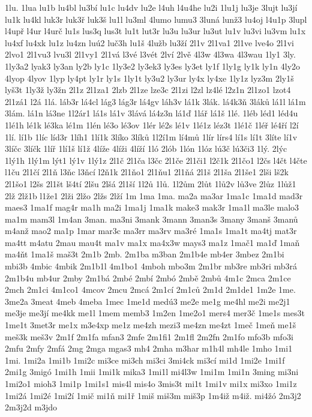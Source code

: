 1lu.
1lua
lu1b
lu4bl
lu3bí
lu1c
lu4dv
lu2e
l4uh
l4u4he
lu2i
1lu1j
lu3je
3lujt
lu3jí
lu1k
lu4kl
luk3r
luk3ř
luk3š
lu1l
lu3ml
4lumo
lumu3
3luná
lunž3
lu4oj
l4u1p
3lupl
l4upř
l4ur
l4urč
lu1s
lus3q
lus3t
lu1t
lut3r
lu3u
lu3ur
lu3ut
lu1v
lu3vi
lu3vm
lu1x
lu4xf
lu4xk
lu1z
lu4zn
luú2
luč3h
lu1š
4lužb
lu3ží
2l1v
2l1va1
2l1ve
lve4o
2l1vi
2lvo1
2l1vu3
lvu3l
2l1vy1
2l1vá
l3vé
l3vét
2lví
2lvě
4l3w
4l3wa
4l3wau
1ly1
3ly.
1ly3a2
lyak3
ly3an
ly2b
ly1c
1ly3e2
ly3ek3
ly3es
ly3et
ly1f
1ly1g
ly1k
ly1n
4ly2o
4lyop
4lyov
1lyp
ly4pt
ly1r
ly1s
1ly1t
ly3u2
ly3ur
ly4x
ly4xe
1ly1z
lyz3m
2ly1š
lyš3t
1ly3ž
ly3žn
2l1z
2l1za1
2lzb
2l1ze
lze3c
2l1zi
l2zl
lz4lé
l2z1n
2l1zo1
lzot4
2l1zá1
l2á
1lá.
láb3r
lá4cl
lág3
lág3r
lá4gv
láh3v
lá1k
3lák.
lá4k3ň
3láků
lá1l
lá1m
3lám.
lá1n
lá3ne
1l2ár1
lá1s
lá1v
3lává
lá4z3n
lá1ď
1lář
lá1š
1lé.
1léb
léd1
léd4u
1lé1h
lé1k
lé3ka
lé1m
1lén
lé3o
lé3ov
1lér
lé2s
lé1v
1lé1z
léz3t
1lé1č
1léř
lé4ří
l2í
1lí.
lí1b
1líc
líd3r
1líh1
1lí1k
3líko
3líků
1l2í1m
lí4mů
1lír
lírs4
lí1s
lí1t
3líte
lí1v
3líčc
3líčk
1líř
1lí1š
lí1ž
4líže
4líži
4líží
1ló
2lób
1lón
1lóz
lú3č
lú3či3
1lý.
2lýc
1lý1h
1lý1m
lýt1
lý1v
1lý1z
2l1č
2l1ča
l3čc
2l1če
2l1či1
l2č1k
2l1čo1
l2čs
l4čt
l4čte
l1ču
2l1čí
2l1ň
l3ňc
l3ňcí
l2ň1k
2l1ňo1
2l1ňu1
2l1ňá
2l1š
2l1ša
2l1še1
2lši
lš2k
2l1šo1
l2šs
2l1št
lš4tí
2lšu
2lšá
2l1ší
1l2ů
1lů.
1l2ům
2lůt
1lů2v
lů3ve
2lůz
1lůž1
2lž
2lž1b
l1že1
2lži
2lžo
2lžs
2lží
1m
1ma
1ma.
ma2a
ma3ar
1ma1c
1ma1d
mad3r
maes3
1ma1f
mag4r
ma1h
ma2i
1ma1j
1ma1k
make3
mak3r
1ma1l
ma3le
malo3
ma1m
mam3l
1m4an
3man.
ma3ni
3mank
3mann
3man3s
3many
3manš
3manů
m4anž
mao2
ma1p
1mar
mar3c
ma3rr
ma3rv
ma3ré
1ma1s
1ma1t
ma4tj
mat3r
ma4tt
m4atu
2mau
mau4t
ma1v
ma1x
ma4x3w
mays3
ma1z
1mač1
ma1ď
1maň
ma4ňt
1ma1š
maš3t
2m1b
2mb.
2m1ba
m3ban
2m1b4e
mb4er
3mbez
2m1bi
mbi3b
4mbic
4mbik
2m1b1l
4m1bo1
4mboh
mbo3m
2m1br
mb3re
mb3ri
mb3rá
2m1b4u
mb4ur
2mby
2m1bá
2mbé
2mbí
2mbó
2mbě
2mbů
4m1c
2mca
2m1ce
2mch
2m1ci
4m1co1
4mcov
2mcu
2mcá
2m1cí
2m1ců
2m1d
2m1de1
1m2e
1me.
3me2a
3meat
4meb
4meba
1mec
1me1d
medú3
me2e
me1g
me4hl
me2i
me2j1
me3je
me3jí
me4kk
me1l
1mem
memb3
1m2en
1me2o1
mers4
mer3č
1me1s
mes3t
1me1t
3met3r
me1x
m3e4xp
me1z
me4zh
mezi3
me4zn
me4zt
1meč
1meň
me1š
meš3k
meš3v
2m1f
2m1fa
mfan3
2mfe
2m1fi1
2m1fl
2m2fn
2m1fo
mfo3b
mfo3i
2mfu
2mfy
2mfá
2mg
2mga
mgas3
mh4
2mha
m3har
m1h4l
mh4le
1mho
1mi1
1mi.
1mi2a
1mi1b
1mi2c
mi3ce
mi3ch
mi3ci
3mi4ck
mi3cí
mi1d
1mi2e
1mi1f
2mi1g
3migó
1mi1h
1mii
1mi1k
mika3
1mi1l
mi4l3w
1mi1m
1mi1n
3ming
mi3ni
1mi2o1
mioh3
1mi1p
1mi1s1
mis4l
mis4o
3mis3t
mi1t
1mi1v
mi1x
mi3xo
1mi1z
1mi2á
1mi2é
1mi2í
1mič
mi1ň
mi1ř
1miš
miš3m
miš3p
1m4iž
m4iž.
mi4žó
2m3j2
2m3j2d
m3jdo
